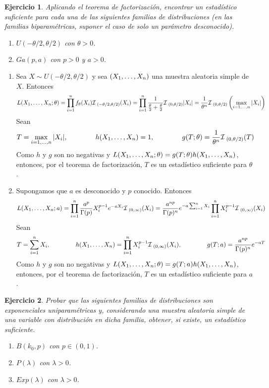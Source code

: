 \documentclass[11pt]{report}
\makeatletter
\renewenvironment{proof}[1][\proofname]{\par
  \pushQED{\qed}%
  \normalfont \topsep\z@skip %
  \trivlist
  \item[\hskip\labelsep
        \itshape
    #1\@addpunct{.}]\ignorespaces
}{%
  \popQED\endtrivlist\@endpefalse
}
\newtheorem{ejercicio}{Ejercicio}
\makeatother
\begin{document}
\begin{ejercicio}
  Aplicando el teorema de factorización, encontrar un estadístico suficiente para cada una de las siguientes familias de distribuciones (en las familias biparamétricas, suponer el caso de solo un parámetro desconocido).
  \begin{enumerate}
    \item $U(-\theta/2,\theta/2)$ con $\theta>0$.
    \item $Ga(p,a)$ con $p>0$ y $a>0$.
  \end{enumerate}
\end{ejercicio}

\begin{proof}
  \hfill
  \begin{enumerate}
    \item Sea $X \sim U(-\theta/2,\theta/2)$ y sea $(X_1,\mathellipsis,X_n)$ una muestra aleatoria simple de $X$. Entonces
    \[L(X_1,\mathellipsis,X_n;\theta) = \prod_{i=1}^n f_\theta(X_i) \mathcal{I}_{\, \,(-\theta/2,\theta/2)}(X_i) = \prod_{i=1}^n \frac{1}{\frac{\theta}{2}+\frac{\theta}{2}}  \mathcal{I}_{\, \,(0,\theta/2)}|X_i|=  \frac{1}{\theta^n}\mathcal{I}_{\, \,(0,\theta/2)}\left(\max_{i=1,\mathellipsis,n} |X_i|\right)\]
    Sean
    \[T = \max_{i=1,\mathellipsis,n} |X_i|, \qquad \qquad h(X_1,\mathellipsis,X_n) = 1, \qquad \qquad g(T;\theta) = \frac{1}{\theta^n}\mathcal{I}_{\, \,(0,\theta/2)}(T)\]
    Como $h$ y $g$ son no negativas y $L(X_1,\mathellipsis,X_n;\theta) = g(T;\theta)h(X_1,\mathellipsis,X_n)$, entonces, por el teorema de factorización, $T$ es un estadístico suficiente para $\theta$.
    \item Supongamos que $a$ es desconocido y $p$ conocido. Entonces
    \[L(X_1,\mathellipsis,X_n;a) = \prod_{i=1}^n \frac{a^p}{\Gamma(p)}X_i^{p-1}e^{-aX_i} \mathcal{I}_{\, \,(0,\infty)}(X_i) =  \frac{a^{np}}{\Gamma(p)^n}e^{-a\sum_{i=1}^n X_i}\prod_{i=1}^n X_i^{p-1} \mathcal{I}_{\, \,(0,\infty)}(X_i)\]
    Sean
    \[T = \sum_{i=1}^n X_i, \qquad \qquad h(X_1,\mathellipsis,X_n) = \prod_{i=1}^n X_i^{p-1} \mathcal{I}_{\, \,(0,\infty)}(X_i), \qquad \qquad g(T;a) = \frac{a^{np}}{\Gamma(p)^n}e^{-aT}\]
    Como $h$ y $g$ son no negativas y $L(X_1,\mathellipsis,X_n;\theta) = g(T;a)h(X_1,\mathellipsis,X_n)$, entonces, por el teorema de factorización, $T$ es un estadístico suficiente para $a$. \qedhere
  \end{enumerate}
\end{proof}

\begin{ejercicio}
  Probar que las siguientes familias de distribuciones son exponenciales uniparamétricas y, considerando una muestra aleatoria simple de una variable con distribución en dicha familia, obtener, si existe, un estadístico suficiente.
  \begin{enumerate}
    \item $B(k_0,p)$ con $p \in (0,1)$.
    \item $P(\lambda)$ con $\lambda>0$.
    \item $Exp(\lambda)$ con $\lambda > 0$.
  \end{enumerate}
\end{ejercicio}
\end{document}
